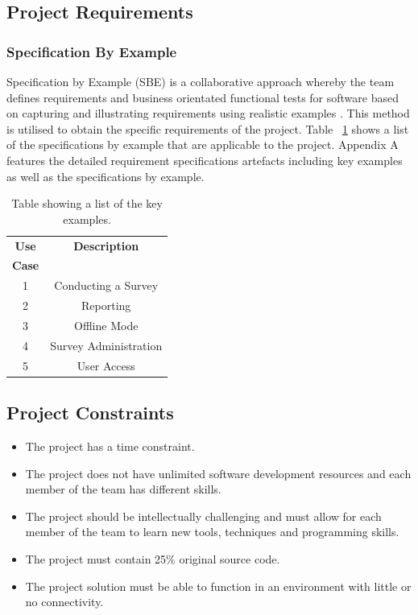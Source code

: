 \documentclass[12pt]{witseiepaper}
\begin{document}
\subsection{Project Requirements}
\subsubsection{Specification By Example}
Specification by Example (SBE) is a collaborative approach whereby the team defines requirements and business orientated functional tests for software based on capturing and illustrating requirements using realistic examples \cite{SBE}. This method is utilised to obtain the specific requirements of the project.
Table ~\ref{tbl:use} shows a list of the specifications by example that are applicable to the project. Appendix A features the detailed requirement specifications artefacts including key examples as well as the specifications by example.

\begin{table}[htb] \caption{Table showing a list of the key examples.} \label{tbl:use} 
    \begin{center}
  \begin{tabular}
    {|c|c|} \hline \textbf{Use} &\textbf{Description}\\
    \textbf{Case} &\\
    \hline 1 &Conducting a Survey\\
    \hline 2 &Reporting\\
    \hline 3 &Offline Mode\\
    \hline 4 &Survey Administration\\
    \hline 5 &User Access\\
    \hline 
  \end{tabular}
      \end{center}
\end{table}

\subsection{Project Constraints}
\begin{itemize}
  \item The project has a time constraint. 
  \item The project does not have unlimited software development resources and each member of the team has different skills. 
  \item The project should be intellectually challenging and must allow for each member of the team to learn new tools, techniques and programming skills.
  \item The project must contain 25\% original source code.
  \item The project solution must be able to function in an environment with little or no connectivity.
\end{itemize}
\end{document}
